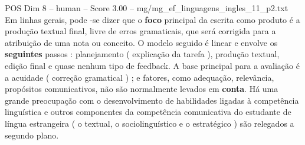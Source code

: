 \begin{textsample}{POS Dim 8 – human – Score 3.00 – mg/mg\_ef\_linguagens\_ingles\_11\_p2.txt}  \label{ex:f8_pos_001}
Em linhas gerais, pode -se dizer que o \textbf{foco} principal da escrita como produto é a produção textual final, livre de erros gramaticais, que será corrigida para a atribuição de uma nota ou conceito.
O modelo seguido é linear e envolve os \textbf{seguintes} passos : planejamento ( explicação da tarefa ), produção textual, edição final e quase nenhum tipo de feedback.
A base principal para a avaliação é a acuidade ( correção gramatical ) ; e fatores, como adequação, relevância, propósitos comunicativos, não são normalmente levados em \textbf{conta}.
Há uma grande preocupação com o desenvolvimento de habilidades ligadas à competência linguística e outros componentes da competência comunicativa do estudante de língua estrangeira ( o textual, o sociolinguístico e o estratégico ) são relegados a segundo plano.

\end{textsample}
